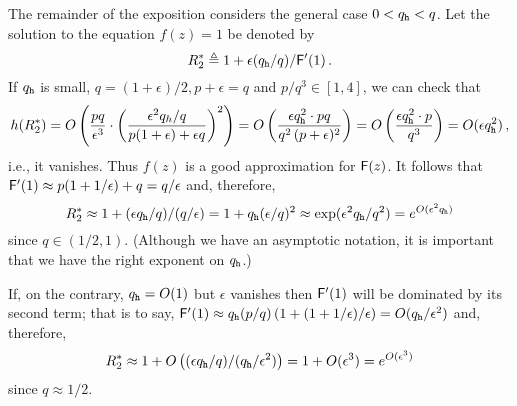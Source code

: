   The remainder of the exposition considers 
  the general case $0 < q_{\mathtt{h}} < q$. 
  Let the solution to the equation $f(z) = 1$ be denoted by 
  $$
    R_2^* \triangleq 1 + \epsilon (q_{\mathtt{h}}/q)/\mathsf{F}'(1)
    \,.
  $$ 
  If $q_{\mathtt{h}}$ is small, $q = (1+\epsilon)/2, p+\epsilon = q$ and $p/q^3 \in [1,4]$, 
  we can check that 
  \[
    h(R_2^*)
    = O\left(\frac{pq}{\epsilon^3} \cdot \left( \frac{\epsilon^2 q_h/q}{p(1+\epsilon) + \epsilon q} \right)^2 \right) 
    =O\left(\frac{ \epsilon q_{\mathtt{h}}^2 \cdot pq}{q^2\,(p + \epsilon )^2}\right)
    =O\left(\frac{ \epsilon q_{\mathtt{h}}^2 \cdot p}{q^3}\right)
    = O(\epsilon q_{\mathtt{h}}^2)
    \,,
  \]
  i.e., it vanishes.
  Thus $f(z)$ is a good approximation for $\mathsf{F}(z)$.
  It follows that 
  $\mathsf{F}'(1) \approx p(1+1/\epsilon) + q = q/\epsilon$ 
  and, therefore, 
  $$R_2^* 
    \approx 1 + (\epsilon q_{\mathtt{h}}/q)/(q/\epsilon) 
    = 1 + q_{\mathtt{h}}(\epsilon/q)^2 
    \approx \exp(\epsilon^2 q_{\mathtt{h}}/q^2)
    = e^{O(\epsilon^2 q_{\mathtt{h}})}
  $$ 
  since $q \in (1/2, 1)$. 
  (Although we have an asymptotic notation, 
  it is important that we have the right exponent on $q_{\mathtt{h}}$.)
  
  If, on the contrary, $q_{\mathtt{h}} = O(1)$ but $\epsilon$ vanishes then 
  $\mathsf{F}'(1)$ will be dominated by its second term; 
  that is to say, 
  $\mathsf{F}'(1) 
  \approx q_{\mathtt{h}}(p/q) \left(1+(1+1/\epsilon)/\epsilon \right) 
  = O(q_{\mathtt{h}}/\epsilon^2)
  $
  and, therefore, 
  $$R_2^* 
  \approx 1 + O\left( (\epsilon q_{\mathtt{h}}/q)/( q_{\mathtt{h}}/\epsilon^2) \right) 
  = 1 + O(\epsilon^3) 
  = e^{O(\epsilon^3)}
  $$ since $q \approx 1/2$.
 


